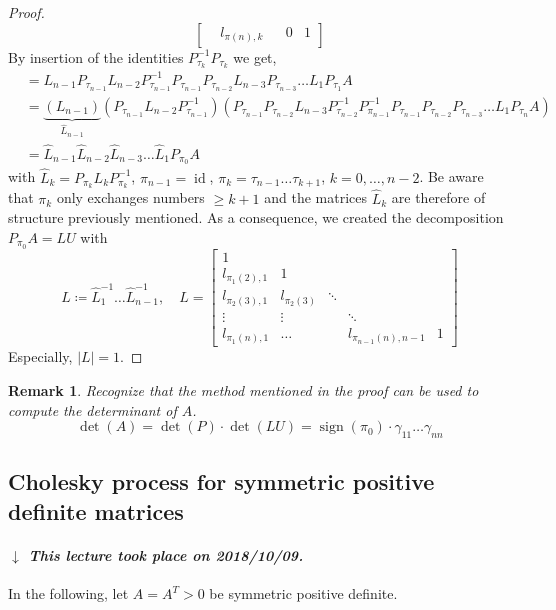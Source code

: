 \documentclass[a4paper]{article}
\newcounter{lecref}[section]
\numberwithin{lecref}{section}
\theoremstyle{break}
\newtheorem{remark}[lecref]{Remark}
\newcommand{\dateref}[1]{%
  \begin{mdframed}[backgroundcolor=gray!10,innerbottommargin=0pt,innertopmargin=0pt]
    \paragraph{\textit{$\downarrow$ This lecture took place on #1.}}%
  \end{mdframed}%
}
\newcommand{\Abs}[1]{\left|#1\right|}
\DeclareMathOperator{\sign}{sign}
\begin{document}
\begin{proof}
\[\begin{bmatrix}
        & l_{\pi(n),k}    &   & 0      & 1
    \end{bmatrix}
  \]
  By insertion of the identities $P_{\tau_k}^{-1} P_{\tau_k}$ we get,
  \begin{align*}
     &= L_{n-1} P_{\tau_{n-1}} L_{n-2} P_{\tau_{n-1}}^{-1} P_{\tau_{n-1}} P_{\tau_{n-2}} L_{n-3} P_{\tau_{n-3}} \dots L_1 P_{\tau_1} A \\
     &= \underbrace{(L_{n-1})}_{\hat L_{n-1}} (P_{\tau_{n-1}} L_{n-2} P_{\tau_{n-1}}^{-1}) (P_{\tau_{n-1}} P_{\tau_{n-2}} L_{n-3} P_{\tau_{n-2}}^{-1} P_{\pi_{n-1}}^{-1} P_{\tau_{n-1}} P_{\tau_{n-2}} P_{\tau_{n-3}} \dots L_1 P_{\tau_n} A) \\
     &= \hat L_{n-1} \hat L_{n-2} \hat L_{n-3} \dots \hat L_1 P_{\pi_0} A
  \end{align*}
  with $\hat L_k = P_{\pi_k} L_k P_{\pi_k}^{-1}$, $\pi_{n-1} = \operatorname{id}$, $\pi_k = \tau_{n-1} \dots \tau_{k+1}$, $k = 0, \dots, n-2$.
  Be aware that $\pi_k$ only exchanges numbers $\geq k+1$ and the matrices $\hat L_k$ are therefore of structure previously mentioned.
  As a consequence, we created the decomposition $P_{\pi_0} A = LU$ with
  \[
    L \coloneqq \hat L_1^{-1} \dots \hat L_{n-1}^{-1}, \quad
    L = \begin{bmatrix}
      1              &              &        & \\
      l_{\pi_1(2),1} & 1            &        &  \\
      l_{\pi_2(3),1} & l_{\pi_2(3)} & \ddots & \\
      \vdots         & \vdots       &        & \ddots \\
      l_{\pi_1(n),1} & \dots        &        & l_{\pi_{n-1}(n), n-1} & 1
    \end{bmatrix}
  \]
  Especially, $\Abs{L} = 1$.
\end{proof}

\begin{remark}
  Recognize that the method mentioned in the proof can be used to compute the determinant of $A$.
  \[ \det(A) = \det(P) \cdot \det(LU) = \sign(\pi_0) \cdot \gamma_{11} \dots \gamma_{nn} \]
\end{remark}

\subsection{Cholesky process for symmetric positive definite matrices}
\label{ch:1-4}

\dateref{2018/10/09}
In the following, let $A = A^T > 0$ be symmetric positive definite.
\end{document}
